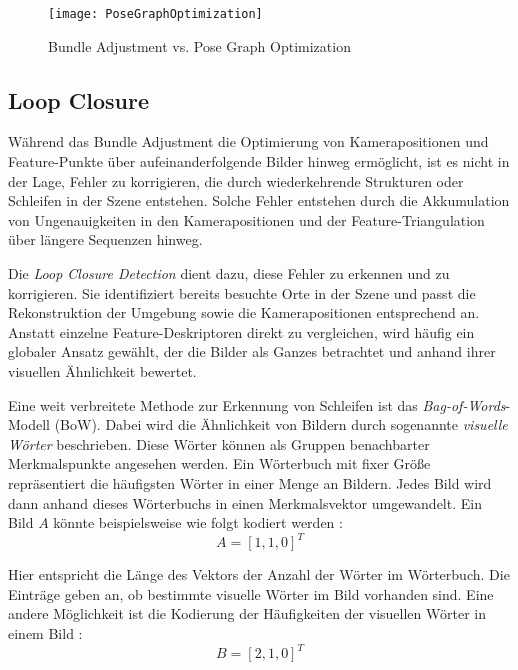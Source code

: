 \begin{figure}
    \centering
    \texttt{[image: PoseGraphOptimization]}
    \caption{Bundle Adjustment vs. Pose Graph Optimization \cite{gao2021vSLAM}\label{fig:PoseGraph}}\par
\end{figure}

\subsection{Loop Closure}

Während das Bundle Adjustment die Optimierung von Kamerapositionen und Feature-Punkte über aufeinanderfolgende Bilder hinweg ermöglicht, ist es nicht in der Lage, Fehler zu korrigieren, die durch wiederkehrende Strukturen oder Schleifen in der Szene entstehen. Solche Fehler entstehen durch die Akkumulation von Ungenauigkeiten in den Kamerapositionen und der Feature-Triangulation über längere Sequenzen hinweg. \cite{gao2021vSLAM, cadena2016slam}

Die \textit{Loop Closure Detection} dient dazu, diese Fehler zu erkennen und zu korrigieren. Sie identifiziert bereits besuchte Orte in der Szene und passt die Rekonstruktion der Umgebung sowie die Kamerapositionen entsprechend an. Anstatt einzelne Feature-Deskriptoren direkt zu vergleichen, wird häufig ein globaler Ansatz gewählt, der die Bilder als Ganzes betrachtet und anhand ihrer visuellen Ähnlichkeit bewertet. \cite{gao2021vSLAM, cadena2016slam}

Eine weit verbreitete Methode zur Erkennung von Schleifen ist das \emph{Bag-of-Words}-Modell (BoW). Dabei wird die Ähnlichkeit von Bildern durch sogenannte \emph{visuelle Wörter} beschrieben. Diese Wörter können als Gruppen benachbarter Merkmalspunkte angesehen werden. Ein Wörterbuch mit fixer Größe repräsentiert die häufigsten Wörter in einer Menge an Bildern. Jedes Bild wird dann anhand dieses Wörterbuchs in einen Merkmalsvektor umgewandelt. Ein Bild \( A \) könnte beispielsweise wie folgt kodiert werden \cite{gao2021vSLAM, yoon2024BoW}: 
\begin{equation}
    A = [1, 1, 0]^T
\end{equation}

Hier entspricht die Länge des Vektors der Anzahl der Wörter im Wörterbuch. Die Einträge geben an, ob bestimmte visuelle Wörter im Bild vorhanden sind. Eine andere Möglichkeit ist die Kodierung der Häufigkeiten der visuellen Wörter in einem Bild \cite{gao2021vSLAM}:
\begin{equation}
    B = [2, 1, 0]^T
\end{equation}

